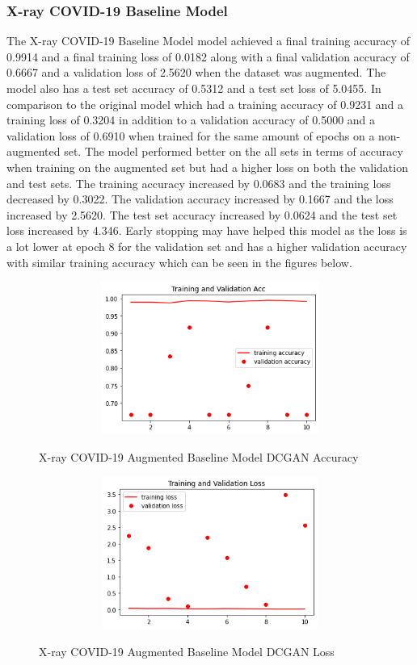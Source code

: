 \subsubsection{X-ray COVID-19 Baseline Model}
The X-ray COVID-19 Baseline Model model achieved a final training accuracy of 0.9914 and a final training loss of 0.0182 along with a final validation accuracy of 0.6667 and a validation loss of 2.5620 when the dataset was augmented.  The model also has a test set accuracy of 0.5312 and a test set loss of 5.0455.  In comparison to the original model which had a training accuracy of 0.9231 and a training loss of 0.3204 in addition to a validation accuracy of 0.5000 and a validation loss of 0.6910 when trained for the same amount of epochs on a non-augmented set.  The model performed better on the all sets in terms of accuracy when training on the augmented set but had a higher loss on both the validation and test sets.  The training accuracy increased by 0.0683 and the training loss decreased by 0.3022. The validation accuracy increased by 0.1667 and the loss increased by 2.5620.  The test set accuracy increased by 0.0624 and the test set loss increased by 4.346.  Early stopping may have helped this model as the loss is a lot lower at epoch 8 for the validation set and has a higher validation accuracy with similar training accuracy which can be seen in the figures below. 
 \begin{figure}[H]
    \centering    \includegraphics[width=1\textwidth,height=5cm,keepaspectratio]{Images/X-ray COVID-19 dataset CNN Train and Val Acc Augmented DCGAN.png}\\
    \caption{X-ray COVID-19 Augmented Baseline Model DCGAN Accuracy}
    \label{fig:X-ray COVID-19 Augmented Baseline Model DCGAN Accuracy}
\end{figure}
 \begin{figure}[H]
    \centering
    \includegraphics[width=1\textwidth,height=5cm,keepaspectratio]{Images/X-ray COVID-19 dataset CNN Train and Val Loss Augmented DCGAN.png}\\
    \caption{X-ray COVID-19 Augmented Baseline Model DCGAN Loss}
    \label{fig:X-ray COVID-19 Augmented Baseline Model DCGAN Loss}
\end{figure}
